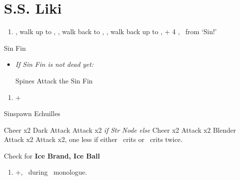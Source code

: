 \chapter{S.S. Liki}

\begin{enumerate}
    \item \cs[2:00], walk up to \yuna, \sd, walk back to \wakka, \sd, walk back up to \yuna, \cs + 4 \skippablefmv[4:20], \sd\ from `Sin!'
\end{enumerate}
\begin{battle}[2000]{Sin Fin}
    \begin{itemize}
        \tidusf Defend
        \switch{\yuna}{\lulu}
        \luluf Thunder the Sin Fin
        \switch{\kimahri}{\yuna}
        \summon{\valefor}
        \valeforf Energy Ray \od\ on Sin Fin
        \enemyf Move x2 and Spines x2
        \valeforf Thunder the Sin Fin
        \enemyf Spines and Move
        \valeforf Thunder the Sin Fin x2
        \item \textit{If Sin Fin is not dead yet:}
        \begin{itemize}
            \enemyf Spines
            \switch{\tidus}{\wakka}
            \wakkaf Attack the Sin Fin
        \end{itemize}
    \end{itemize}
\end{battle}
\begin{enumerate}[resume]
    \item \fmv+\cs[1:40]
\end{enumerate}
\begin{battle}[2000]{Sinspawn Echuilles}
    \begin{itemize}
        \tidusf Cheer x2
        \wakkaf Dark Attack
        \tidusf Attack x2 \textit{if Str Node else} Cheer x2
        \wakkaf Attack x2
        \enemyf Blender
        \wakkaf Attack x2
        \tidusf Attack x2, one less if either \tidus\ crits or \wakka\ crits twice.
        \tidusf \od
    \end{itemize}
    Check for \textbf{Ice Brand, Ice Ball}
\end{battle}
\begin{enumerate}[resume]
    \item \skippablefmv+\cs[1:30], \sd\ during \tidus\ monologue.
\end{enumerate}